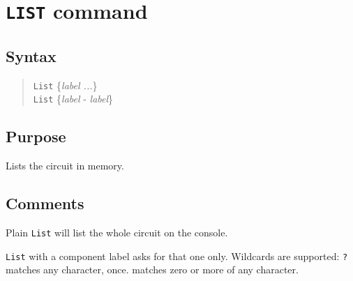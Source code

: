%
%
%
%
\section{{\tt LIST} command}
\subsection{Syntax}
\begin{verse}
{\tt List} \{{\it label ...}\} \\
{\tt List} \{{\it label} - {\it label}\}
\end{verse}
\subsection{Purpose}

Lists the circuit in memory.
\subsection{Comments}

Plain {\tt List} will list the whole circuit on the console.

{\tt List} with a component label asks for that one only.  Wildcards are
supported: {\tt ?} matches any character, once.  {\tt *} matches zero or
more of any character.


